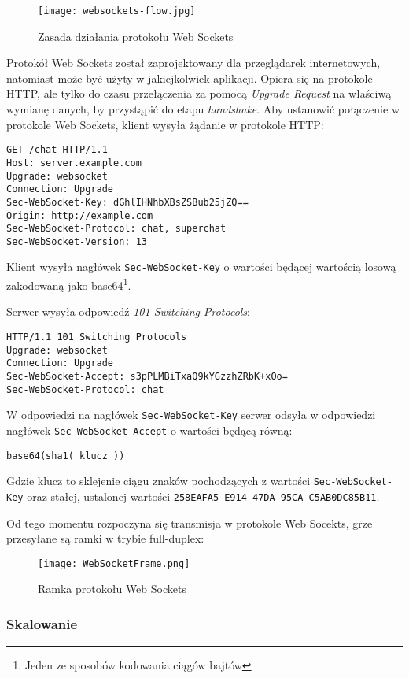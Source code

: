 \begin{figure}[H]
  \caption[Zasada działania protokołu Web Sockets]{Zasada działania protokołu Web Sockets}
  \centering
    \texttt{[image: websockets-flow.jpg]}
\end{figure}

Protokół Web Sockets został zaprojektowany dla przeglądarek internetowych, natomiast może być użyty w jakiejkolwiek aplikacji. Opiera się na protokole HTTP, ale tylko do czasu przełączenia za pomocą \emph{Upgrade Request} na właściwą wymianę danych, by przystąpić do etapu \emph{handshake}. Aby ustanowić połączenie w protokole Web Sockets, klient wysyła żądanie w protokole HTTP:

\lstset{language=Octave}
\begin{lstlisting}
GET /chat HTTP/1.1
Host: server.example.com
Upgrade: websocket
Connection: Upgrade
Sec-WebSocket-Key: dGhlIHNhbXBsZSBub25jZQ==
Origin: http://example.com
Sec-WebSocket-Protocol: chat, superchat
Sec-WebSocket-Version: 13
\end{lstlisting}

Klient wysyła nagłówek \lstinline{Sec-WebSocket-Key} o wartości będącej wartością losową zakodowaną jako base64\footnote{Jeden ze sposobów kodowania ciągów bajtów}.

Serwer wysyła odpowiedź \emph{101 Switching Protocols}:

\lstset{language=Octave}
\begin{lstlisting}
HTTP/1.1 101 Switching Protocols
Upgrade: websocket
Connection: Upgrade
Sec-WebSocket-Accept: s3pPLMBiTxaQ9kYGzzhZRbK+xOo=
Sec-WebSocket-Protocol: chat
\end{lstlisting}

W odpowiedzi na nagłówek \lstinline{Sec-WebSocket-Key} serwer odsyła w odpowiedzi nagłówek \lstinline{Sec-WebSocket-Accept} o wartości będącą równą:

\vspace*{1\baselineskip}
\lstinline{base64(sha1( klucz ))}
\vspace*{1\baselineskip}

Gdzie klucz to sklejenie ciągu znaków pochodzących z wartości \lstinline{Sec-WebSocket-Key} oraz stałej, ustalonej wartości \lstinline{258EAFA5-E914-47DA-95CA-C5AB0DC85B11}.

Od tego momentu rozpoczyna się transmisja w protokole Web Socekts, grze przesyłane są ramki w trybie full-duplex:

\begin{figure}[H]
  \caption[Ramka protokołu Web Sockets]{Ramka protokołu Web Sockets}
  \centering
    \texttt{[image: WebSocketFrame.png]}
\end{figure}

\subsubsection{Skalowanie}
\label{subsub:scalability}

